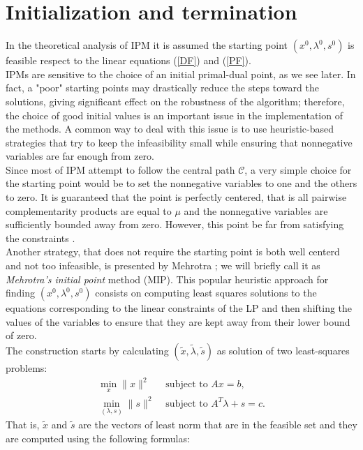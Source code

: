 \documentclass[a4paper,10 pt,titlepage,twoside]{book}
\theoremstyle{plain}
\theoremstyle{definition}
\theoremstyle{remark}
\begin{document}
\section*{Initialization and termination}
In the theoretical analysis of IPM it is assumed the starting point $(x^{0}, \lambda^{0}, s^{0})$ is feasible respect to the linear equations (\ref{DF}) and (\ref{PF}).\\
IPMs are sensitive to the choice of an initial primal-dual point, as we see later. In fact, a "poor" starting points may drastically reduce the steps toward the solutions, giving significant effect on the robustness of the algorithm; therefore, the choice of good initial values is an important issue in the implementation of the methods. A common way to deal with this issue is to use heuristic-based strategies that try to keep the infeasibility small while ensuring that nonnegative variables are far enough from zero.\\
Since most of IPM attempt to follow the central path $\mathcal{C}$, a very simple choice for the starting point would be to set the nonnegative variables to one and the others to zero. It is guaranteed that the point is perfectly centered, that is all pairwise complementarity products are equal to $\mu$ and the nonnegative variables are sufficiently bounded away from zero. However, this point be far from satisfying the constraints \cite{VAN}.\\
Another strategy, that does not require the starting point is both well centerd and not too infeasible, is presented by Mehrotra \cite{MER}; we will briefly call it as \textit{Mehrotra's initial point} method (MIP). This popular heuristic approach for finding $(x^{0}, \lambda^{0}, s^{0})$ consists on computing least squares solutions to the equations corresponding to the linear constraints of the LP and then shifting the values of the variables to ensure that they are kept away from their lower bound of zero. \\
The construction starts by calculating $(\tilde{x}, \tilde{\lambda}, \tilde{s})$ as solution of two least-squares problems:
\begin{align*}
\min\limits_{x} \lVert x \rVert ^{2} &\text{ subject to }Ax = b,\\
\min\limits_{(\lambda,s)} \lVert s \rVert ^{2} &\text{ subject to } A^{T}\lambda +s = c.
\end{align*}
That is, $\tilde{x}$ and $\tilde{s}$ are the vectors of least norm that are in the feasible set and they are computed using the following formulas:
\end{document}
